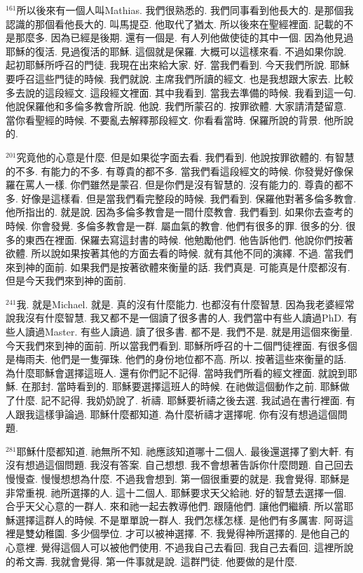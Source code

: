 \documentclass{book}
\begin{document}
$^{161}$所以後來有一個人叫Mathias.
我們很熟悉的.
我們同事看到他長大的.
是那個我認識的那個看他長大的.
叫馬提亞.
他取代了猶太.
所以後來在聖經裡面.
記載的不是那麼多.
因為已經是後期.
還有一個是.
有人列他做使徒的其中一個.
因為他見過耶穌的復活.
見過復活的耶穌.
這個就是保羅.
大概可以這樣來看.
不過如果你說.
起初耶穌所呼召的門徒.
我現在出來給大家.
好.
當我們看到.
今天我們所說.
耶穌要呼召這些門徒的時候.
我們就說.
主席我們所讀的經文.
也是我想跟大家去.
比較多去說的這段經文.
這段經文裡面.
其中我看到.
當我去準備的時候.
我看到這一句.
他說保羅他和多倫多教會所說.
他說.
我們所蒙召的.
按罪欲體.
大家請清楚留意.
當你看聖經的時候.
不要亂去解釋那段經文.
你看看當時.
保羅所說的背景.
他所說的.

$^{201}$究竟他的心意是什麼.
但是如果從字面去看.
我們看到.
他說按罪欲體的.
有智慧的不多.
有能力的不多.
有尊貴的都不多.
當我們看這段經文的時候.
你發覺好像保羅在罵人一樣.
你們雖然是蒙召.
但是你們是沒有智慧的.
沒有能力的.
尊貴的都不多.
好像是這樣看.
但是當我們看完整段的時候.
我們看到.
保羅他對著多倫多教會.
他所指出的.
就是說.
因為多倫多教會是一間什麼教會.
我們看到.
如果你去查考的時候.
你會發覺.
多倫多教會是一群.
屬血氣的教會.
他們有很多的罪.
很多的分.
很多的東西在裡面.
保羅去寫這封書的時候.
他勉勵他們.
他告訴他們.
他說你們按著欲體.
所以說如果按著其他的方面去看的時候.
就有其他不同的演繹.
不過.
當我們來到神的面前.
如果我們是按著欲體來衡量的話.
我們真是.
可能真是什麼都沒有.
但是今天我們來到神的面前.

$^{241}$我.
就是Michael.
就是.
真的沒有什麼能力.
也都沒有什麼智慧.
因為我老婆經常說我沒有什麼智慧.
我又都不是一個讀了很多書的人.
我們當中有些人讀過PhD.
有些人讀過Master.
有些人讀過.
讀了很多書.
都不是.
我們不是.
就是用這個來衡量.
今天我們來到神的面前.
所以當我們看到.
耶穌所呼召的十二個門徒裡面.
有很多個是梅雨夫.
他們是一隻彈珠.
他們的身份地位都不高.
所以.
按著這些來衡量的話.
為什麼耶穌會選擇這班人.
還有你們記不記得.
當時我們所看的經文裡面.
就說到耶穌.
在那封.
當時看到的.
耶穌要選擇這班人的時候.
在祂做這個動作之前.
耶穌做了什麼.
記不記得.
我奶奶說了.
祈禱.
耶穌要祈禱之後去選.
我試過在書行裡面.
有人跟我這樣爭論過.
耶穌什麼都知道.
為什麼祈禱才選擇呢.
你有沒有想過這個問題.

$^{281}$耶穌什麼都知道.
祂無所不知.
祂應該知道哪十二個人.
最後還選擇了劉大軒.
有沒有想過這個問題.
我沒有答案.
自己想想.
我不會想著告訴你什麼問題.
自己回去慢慢查.
慢慢想想為什麼.
不過我會想到.
第一個很重要的就是.
我會覺得.
耶穌是非常重視.
祂所選擇的人.
這十二個人.
耶穌要求天父給祂.
好的智慧去選擇一個.
合乎天父心意的一群人.
來和祂一起去教導他們.
跟隨他們.
讓他們繼續.
所以當耶穌選擇這群人的時候.
不是單單說一群人.
我們怎樣怎樣.
是他們有多厲害.
阿哥這裡是雙幼稚園.
多少個學位.
才可以被神選擇.
不.
我覺得神所選擇的.
是他自己的心意裡.
覺得這個人可以被他們使用.
不過我自己去看回.
我自己去看回.
這裡所說的希文壽.
我就會覺得.
第一件事就是說.
這群門徒.
他要做的是什麼.
\end{document}
